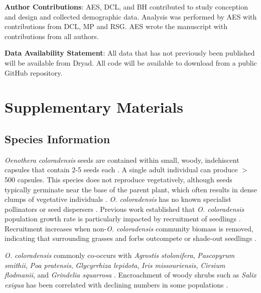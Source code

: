 \documentclass[12pt, letterpaper]{article}
\renewcommand{\thesection}{} %
\begin{document}
\small{
\textbf{Author Contributions}: AES, DCL, and BH contributed to study conception and design and collected demographic data. Analysis was performed by AES with contributions from DCL, MP and RSG. AES wrote the manuscript with contributions from all authors. 
} 

\small{\textbf{Data Availability Statement}: All data that has not previously been published will be available from Dryad. All code will be available to download from a public GitHub repository.}



\newpage

\setcounter{figure}{0}
\setcounter{table}{0}
\setcounter{section}{0}
\setcounter{page}{1}

\renewcommand{\thepage}{S\arabic{page}}
\renewcommand{\thesection}{S\arabic{section}}
\renewcommand{\thetable}{S\arabic{table}}
\renewcommand{\thefigure}{S\arabic{figure}}

\section{Supplementary Materials}
\normalfont
\subsection{Species Information}
\textit{Oenothera coloradensis} seeds are contained within small, woody, indehiscent capsules that contain 2-5 seeds each \cite{Burgess2005CapsuleColoradensis}. A single adult individual can produce $>$500 capsules. This species does not reproduce vegetatively, although seeds typically germinate near the base of the parent plant, which often results in dense clumps of vegetative individuals \cite{Heidel202133-YearWyoming}. \textit{O. coloradensis} has no known specialist pollinators or seed dispersers \cite{Floyd1998, Heidel202133-YearWyoming}. Previous work established that \textit{O. coloradensis} population growth rate is particularly impacted by recruitment of seedlings \cite{Floyd1998}. Recruitment increases when non-\textit{O. coloradensis} community biomass is removed, indicating that surrounding grasses and forbs outcompete or shade-out seedlings \cite{Munk2002RosetteSpecies}.

\textit{O. coloradensis} commonly co-occurs with \textit{Agrostis stolonifera}, \textit{Pascopyrum smithii}, \textit{Poa pratensis}, \textit{Glycyrrhiza lepidota}, \textit{Iris missouriensis}, \textit{Cirsium flodmanii}, and \textit{Grindelia squarrosa} \cite{Jennings2000EndangeredNebraska, Munk2002RosetteSpecies}. Encroachment of woody shrubs such as \textit{Salix exigua} has been correlated with declining numbers in some populations \cite{Heidel202133-YearWyoming}.
\end{document}
